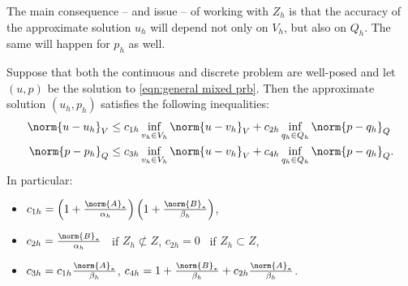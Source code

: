 The main consequence -- and issue -- of working with $Z_h$ is that the accuracy of the approximate solution $u_h$ will depend not only on $V_h$, but also on $Q_h$. The same will happen for $p_h$ as well.
\begin{theorem}
	Suppose that both the continuous and discrete problem are well-posed and let $(u,p)$ be the solution to \eqref{eqn:general mixed prb}. Then the approximate solution $(u_h,p_h)$ satisfies the following inequalities:
	\begin{align}
		\norm{u-u_h}_V &\le c_{1h} \inf_{v_h\in V_h}\norm{u-v_h}_V + c_{2h} \inf_{q_h\in Q_h}\norm{p-q_h}_Q \\
		\norm{p-p_h}_Q &\le c_{3h} \inf_{v_h\in V_h}\norm{u-v_h}_V + c_{4h} \inf_{q_h\in Q_h}\norm{p-q_h}_Q.
	\end{align}
	In particular:
	\begin{itemize}
		\item $c_{1h} = \left( 1+\frac{\norm{A}_*}{\alpha_h}\right) \left( 1+\frac{\norm{B}_*}{\beta_h}\right)$,
		\item $c_{2h} = \frac{\norm{B}_*}{\alpha_h}$ \, if $Z_h \not\subset Z$, \quad $c_{2h} = 0$ \, if $Z_h \subset Z$,
		\item $c_{3h} = c_{1h} \frac{\norm{A}_*}{\beta_h}$, \quad $c_{4h} = 1 + \frac{\norm{B}_*}{\beta_h} + c_{2h} \frac{\norm{A}_*}{\beta_h}$.
	\end{itemize}
\end{theorem}
